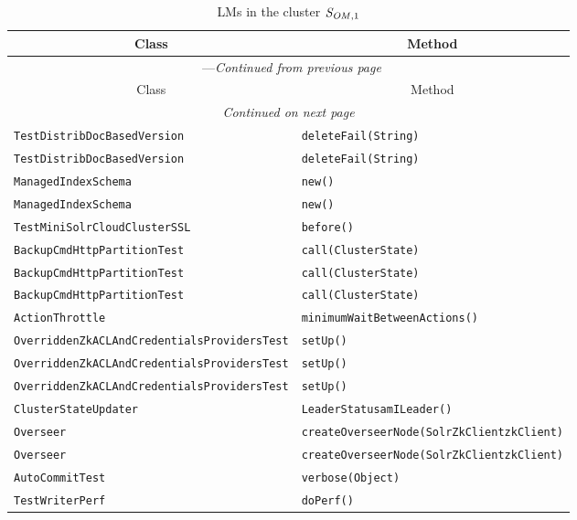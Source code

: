 \begin{center}
\begin{longtable}{ll}
\caption{LMs in the cluster $\mathit{S}_{\mathit{OM},1}$}\\
\toprule\multicolumn{1}{c}{Class}&\multicolumn{1}{c}{Method}\\\midrule
\endfirsthead

\multicolumn{2}{c}{\tablename\ \thetable{}---\textit{Continued from previous page}} \\\midrule
\multicolumn{1}{c}{Class}&\multicolumn{1}{c}{Method}\\\midrule
\endhead
\multicolumn{2}{c}{\textit{Continued on next page}}\\\midrule
\endfoot
\bottomrule
\endlastfoot

\lstinline/TestDistribDocBasedVersion/&{\lstinline/deleteFail(String)/}\\
\lstinline/TestDistribDocBasedVersion/&{\lstinline/deleteFail(String)/}\\
\lstinline/ManagedIndexSchema/&{\lstinline/new()/}\\
\lstinline/ManagedIndexSchema/&{\lstinline/new()/}\\
\lstinline/TestMiniSolrCloudClusterSSL/&{\lstinline/before()/}\\
\lstinline/BackupCmdHttpPartitionTest/&{\lstinline/call(ClusterState)/}\\
\lstinline/BackupCmdHttpPartitionTest/&{\lstinline/call(ClusterState)/}\\
\lstinline/BackupCmdHttpPartitionTest/&{\lstinline/call(ClusterState)/}\\
\lstinline/ActionThrottle/&{\lstinline/minimumWaitBetweenActions()/}\\
\lstinline/OverriddenZkACLAndCredentialsProvidersTest/&{\lstinline/setUp()/}\\
\lstinline/OverriddenZkACLAndCredentialsProvidersTest/&{\lstinline/setUp()/}\\
\lstinline/OverriddenZkACLAndCredentialsProvidersTest/&{\lstinline/setUp()/}\\
\lstinline/ClusterStateUpdater/&{\lstinline/LeaderStatusamILeader()/}\\
\lstinline/Overseer/&{\lstinline/createOverseerNode(SolrZkClientzkClient)/}\\
\lstinline/Overseer/&{\lstinline/createOverseerNode(SolrZkClientzkClient)/}\\
\lstinline/AutoCommitTest/&{\lstinline/verbose(Object)/}\\
\lstinline/TestWriterPerf/&{\lstinline/doPerf()/}\\

\end{longtable}
\end{center}
